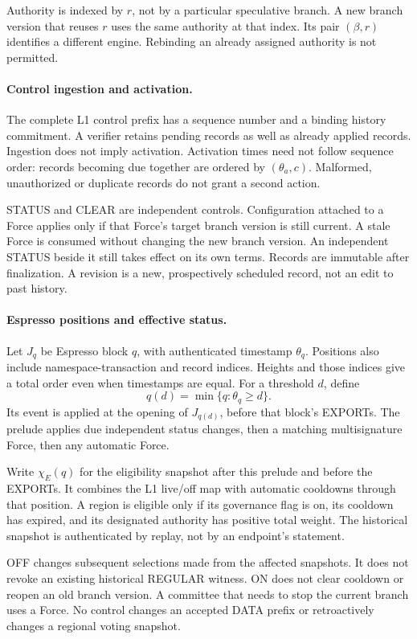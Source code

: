Authority is indexed by $r$, not by a particular speculative branch.
A new branch version that reuses $r$ uses the same authority at that index.
Its pair $(\beta,r)$ identifies a different engine. Rebinding an already
assigned authority is not permitted.

\paragraph{Control ingestion and activation.}
The complete L1 control prefix has a sequence number and a binding
history commitment. A verifier retains pending records as well as
already applied records. Ingestion does not imply activation.
Activation times need not follow sequence order: records becoming due
together are ordered by $(\theta_a,c)$. Malformed, unauthorized or
duplicate records do not grant a second action.

STATUS and CLEAR are independent controls. Configuration attached to
a Force applies only if that Force's target branch version is still current.
A stale Force is consumed without changing the new branch version. An independent
STATUS beside it still takes effect on its own terms.
Records are immutable after finalization. A revision is a new,
prospectively scheduled record, not an edit to past history.

\paragraph{Espresso positions and effective status.}
Let $J_q$ be Espresso block $q$, with authenticated timestamp
$\theta_q$. Positions also include namespace-transaction and record
indices. Heights and those indices give a total order even when
timestamps are equal. For a threshold $d$, define
\[
 q(d)=\min\{q:\theta_q\ge d\}.
\]
Its event is applied at the opening of $J_{q(d)}$, before that block's
EXPORTs. The prelude applies due independent status changes, then a
matching multisignature Force, then any automatic Force.

Write $\chi_E(q)$ for the eligibility snapshot after this prelude and
before the EXPORTs. It combines the L1 live/off map with automatic
cooldowns through that position. A region is eligible only if its
governance flag is on, its cooldown has expired, and its designated
authority has positive total weight. The historical snapshot is
authenticated by replay, not by an endpoint's statement.

OFF changes subsequent selections made from the affected snapshots.
It does not revoke an existing historical REGULAR witness. ON does not
clear cooldown or reopen an old branch version. A committee that needs to stop
the current branch uses a Force. No control changes an accepted DATA
prefix or retroactively changes a regional voting snapshot.

